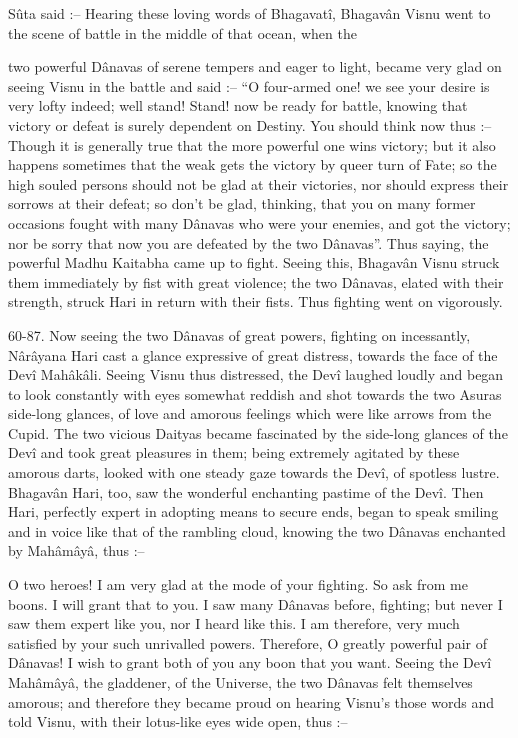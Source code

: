 S\^uta said :-- Hearing these loving words of Bhagavat\^i, Bhagav\^an Visnu went to the scene of battle in the middle of that ocean, when the

two powerful D\^anavas of serene tempers and eager to light, became very glad on seeing Visnu in the battle and said :-- ``O four-armed one! we see your desire is very lofty indeed; well  stand! Stand! now be ready for battle, knowing that victory or defeat is surely dependent on Destiny. You should think now thus :-- Though it is generally true that the more powerful one wins victory; but it also happens sometimes that the weak gets the victory by queer turn of Fate; so the high souled persons should not be glad at their victories, nor should express their sorrows at their defeat; so don’t be glad, thinking, that you on many former occasions fought with many D\^anavas who were your enemies, and got the victory; nor be sorry that now you are defeated by the two D\^anavas''. Thus saying, the powerful Madhu Kaitabha came up to fight. Seeing this, Bhagav\^an Visnu struck them immediately by fist with great violence; the two D\^anavas, elated with their strength, struck Hari in return with their fists. Thus fighting went on vigorously.

60-87. Now seeing the two D\^anavas of great powers, fighting on incessantly, N\^ar\^ayana Hari cast a glance expressive of great distress, towards the face of the Dev\^i Mah\^ak\^ali. Seeing Visnu thus distressed, the Dev\^i laughed loudly and began to look constantly with eyes somewhat reddish and shot towards the two Asuras side-long glances, of love and amorous feelings which were like arrows from the Cupid. The two vicious Daityas became fascinated by the side-long glances of the Dev\^i and took great pleasures in them; being extremely agitated by these amorous darts, looked with one steady gaze towards the Dev\^i, of spotless lustre. Bhagav\^an Hari, too, saw the wonderful enchanting pastime of the Dev\^i. Then Hari, perfectly expert in adopting means to secure ends, began to speak smiling and in voice like that of the rambling cloud, knowing the two D\^anavas enchanted by Mah\^am\^ay\^a, thus :--

O two heroes! I am very glad at the mode of your fighting. So ask from me boons. I will grant that to you. I saw many D\^anavas before, fighting; but never I saw them expert like you, nor I heard like this. I am therefore, very much satisfied by your such unrivalled powers. Therefore, O greatly powerful pair of D\^anavas! I wish to grant both of you any boon that you want. Seeing the Dev\^i Mah\^am\^ay\^a, the gladdener, of the Universe, the two D\^anavas felt themselves amorous; and therefore they became proud on hearing Visnu's those words and told Visnu, with their lotus-like eyes wide open, thus :--

